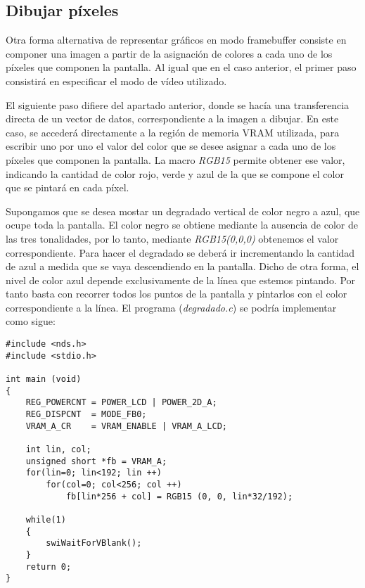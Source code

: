 \subsection{Dibujar píxeles}
\label{sec:p2_c3_pixeles}
Otra forma alternativa de representar gráficos en modo framebuffer consiste en componer una imagen a partir de la asignación de colores a cada uno de los píxeles que componen la pantalla. Al igual que en el caso anterior, el primer paso consistirá en especificar el modo de vídeo utilizado. 
	
El siguiente paso difiere del apartado anterior, donde se hacía una transferencia directa de un vector de datos, correspondiente a la imagen a dibujar. En este caso, se accederá directamente a la región de memoria VRAM utilizada, para escribir uno por uno el valor del color que se desee asignar a cada uno de los píxeles que componen la pantalla. La macro \textit{RGB15} permite obtener ese valor, indicando la cantidad de color rojo, verde y azul de la que se compone el color que se pintará en cada píxel.

\begin{example}
Supongamos que se desea mostar un degradado vertical de color negro a azul, que ocupe toda la pantalla. El color negro se obtiene mediante la ausencia de color de las tres tonalidades, por lo tanto, mediante \textit{RGB15(0,0,0)} obtenemos el valor correspondiente. Para hacer el degradado se deberá ir incrementando la cantidad de azul a medida que se vaya descendiendo en la pantalla. Dicho de otra forma, el nivel de color azul depende exclusivamente de la línea que estemos pintando. Por tanto basta con recorrer todos los puntos de la pantalla y pintarlos con el color correspondiente a la línea. El programa (\textit{degradado.c}) se podría implementar como sigue:
	
\begin{lstlisting}	
#include <nds.h>
#include <stdio.h>

int main (void)
{
	REG_POWERCNT = POWER_LCD | POWER_2D_A;
	REG_DISPCNT  = MODE_FB0;
	VRAM_A_CR    = VRAM_ENABLE | VRAM_A_LCD;
		
	int lin, col;
	unsigned short *fb = VRAM_A;
	for(lin=0; lin<192; lin ++)
		for(col=0; col<256; col ++)
			fb[lin*256 + col] = RGB15 (0, 0, lin*32/192);
		
	while(1)
	{
		swiWaitForVBlank();
	}
	return 0;
}	
\end{lstlisting}
\end{example}
	
